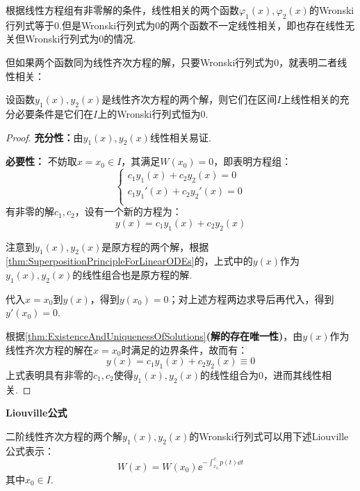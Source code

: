 根据线性方程组有非零解的条件，线性相关的两个函数$\varphi_1(x),\varphi_2(x)$的Wronski行列式等于$0$.但是Wronski行列式为$0$的两个函数不一定线性相关，即也存在线性无关但Wronski行列式为$0$的情况.

但如果两个函数同为线性齐次方程的解，只要Wronski行列式为$0$，就表明二者线性相关：

\begin{theorem}
    \label{thm:WronskianCriterionForLinearDependence}
    设函数$y_1(x),y_2(x)$是线性齐次方程的两个解，则它们在区间$I$上线性相关的充分必要条件是它们在$I$上的Wronski行列式恒为$0$.
\end{theorem}

\begin{proof}
    \textbf{充分性：}由$y_1(x),y_2(x)$线性相关易证.

    \textbf{必要性：}
    不妨取$x=x_0 \in I$，其满足$W(x_0) = 0$，即表明方程组：
    \[\begin{cases}
        c_1 y_1(x) + c_2 y_2(x) = 0\\
        c_1 y_1'(x) + c_2 y_2'(x) = 0\\
    \end{cases}\]
    有非零的解$c_1,c_2$，设有一个新的方程为：
    \[y(x) = c_1 y_1(x) + c_2 y_2(x)\]

    注意到$y_1(x),y_2(x)$是原方程的两个解，根据\cref{thm:SuperpositionPrincipleForLinearODEs}的，上式中的$y(x)$作为$y_1(x),y_2(x)$的线性组合也是原方程的解.

    代入$x=x_0$到$y(x)$，得到$y(x_0) = 0$；对上述方程两边求导后再代入，得到$y'(x_0)=0$.

    根据\cref{thm:ExistenceAndUniquenessOfSolutions}\textbf{(解的存在唯一性)}，由$y(x)$作为线性齐次方程的解在$x=x_0$时满足的边界条件，故而有：
    \[y(x) = c_1 y_1(x) + c_2 y_2(x) \equiv 0\]
    上式表明具有非零的$c_1,c_2$使得$y_1(x),y_2(x)$的线性组合为$0$，进而其线性相关.
\end{proof}

\begin{theorem}
    \textbf{Liouville公式}

    二阶线性齐次方程的两个解$y_1(x),y_2(x)$的Wronski行列式可以用下述Liouville公式表示：
    \[W(x) = W(x_0)\ee^{-\int_{x_0}^{x}p(t)\dd{t}}\]
    其中$x_0 \in I$.
\end{theorem}

